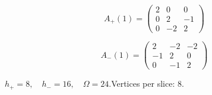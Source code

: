 \begin{minipage}{\linewidth}
\begin{minipage}[c]{0.495\linewidth}
\[A_{+}(1)=\begin{pmatrix}2 & 0 & 0\\0 & 2 & -1\\0 & -2 & 2\end{pmatrix}\]
\end{minipage}%
\begin{minipage}[c]{0.495\linewidth}\centering\fontsize{10.5}{13}\selectfont
\setlength{\abovedisplayskip}{3pt}\setlength{\belowdisplayskip}{3pt}
\setlength{\abovedisplayshortskip}{3pt}\setlength{\belowdisplayshortskip}{3pt}
\setlength{\arraycolsep}{3.5pt}\renewcommand{\arraystretch}{1.18}
\[A_{-}(1)=\begin{pmatrix}2 & -2 & -2\\-1 & 2 & 0\\0 & -1 & 2\end{pmatrix}\]
\end{minipage}%
\par\smallskip\noindent\small $h_+=8,\quad h_-=16,\quad \Omega=24.$\quad Vertices per slice: 8.
\end{minipage}\par\vfill
